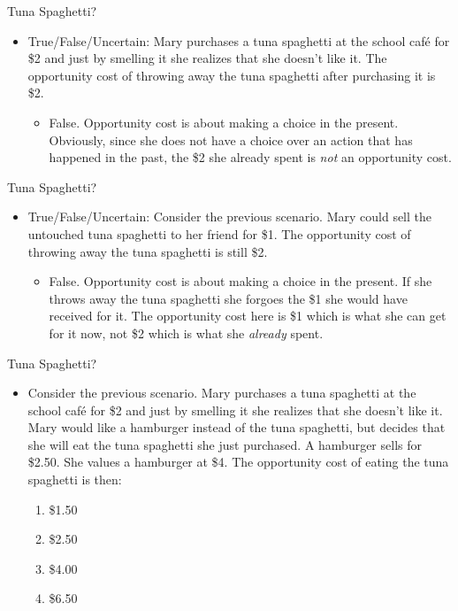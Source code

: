 \documentclass{beamer}
\begin{document}
\begin{frame}{Tuna Spaghetti?}
    \begin{itemize}
        \item True/False/Uncertain: Mary purchases a tuna spaghetti at the school café for \$2 and just by smelling it she realizes that she doesn’t like it. The opportunity cost of throwing away the tuna spaghetti after purchasing it is \$2.
        \begin{itemize}
            \item False. Opportunity cost is about making a choice in the present. Obviously, since she does not have a choice over an action that has happened in the past, the \$2 she already spent is \textit{not} an opportunity cost.
        \end{itemize}
    \end{itemize}
\end{frame}

\begin{frame}{Tuna Spaghetti?}
    \begin{itemize}
        \item True/False/Uncertain: Consider the previous scenario. Mary could sell the untouched tuna spaghetti to her friend for \$1. The opportunity cost of throwing away the tuna spaghetti is still \$2.
        \begin{itemize}
            \item False. Opportunity cost is about making a choice in the present. If she throws away the tuna spaghetti she forgoes the \$1 she would have received for it. The opportunity cost here is \$1 which is what she can get for it now, not \$2 which is what she \textit{already} spent. 
        \end{itemize}
    \end{itemize}
\end{frame}

\beamerdefaultoverlayspecification{}
\begin{frame}{Tuna Spaghetti?}
    \begin{itemize}
        \item Consider the previous scenario. Mary purchases a tuna spaghetti at the school café for \$2 and just by smelling it she realizes that she doesn’t like it. Mary would like a hamburger instead of the tuna spaghetti, but decides that she will eat the tuna spaghetti she just purchased. A hamburger sells for \$2.50. She values a hamburger at \$4. The opportunity cost of eating the tuna spaghetti is then:
        \begin{enumerate}
            \item \$1.50
            \item \$2.50
            \item \$4.00
            \item \$6.50
        \end{enumerate}
    \end{itemize}
\end{frame}
\end{document}

